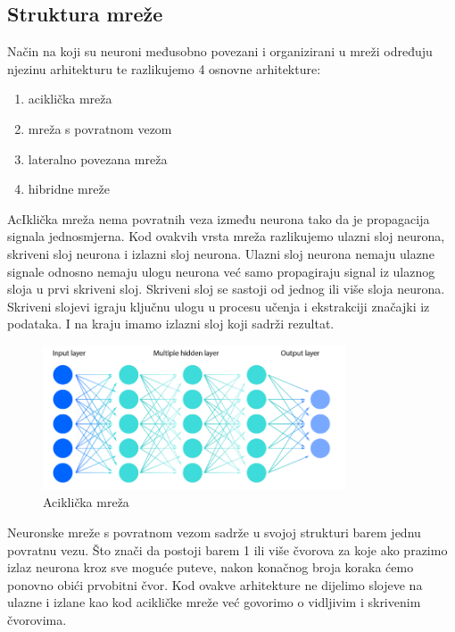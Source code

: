 \subsection{Struktura mreže}\label{subsec:struktura-mreze}
Način na koji su neuroni međusobno povezani i organizirani u mreži određuju njezinu arhitekturu te razlikujemo 4 osnovne arhitekture:

\begin{enumerate}
    \item aciklička mreža
    \item mreža s povratnom vezom
    \item lateralno povezana mreža
    \item hibridne mreže
\end{enumerate}

AcIklička mreža nema povratnih veza između neurona tako da je propagacija signala jednosmjerna.
Kod ovakvih vrsta mreža razlikujemo ulazni sloj neurona, skriveni sloj neurona i izlazni sloj neurona.
Ulazni sloj neurona nemaju ulazne signale odnosno nemaju ulogu neurona već samo propagiraju signal iz ulaznog sloja u prvi skriveni sloj.
Skriveni sloj se sastoji od jednog ili više sloja neurona. Skriveni slojevi igraju ključnu ulogu u procesu učenja i ekstrakciji značajki iz podataka.
I na kraju imamo izlazni sloj koji sadrži rezultat.
\FloatBarrier
\begin{figure}[h]
    \centering
    \includegraphics[width=0.8\textwidth]{images/nn-arch}
    \caption{Aciklička mreža}
    \label{fig:slika4}
\end{figure}
\FloatBarrier

Neuronske mreže s povratnom vezom sadrže u svojoj strukturi barem jednu povratnu vezu.
Što znači da postoji barem 1 ili više čvorova za koje ako prazimo izlaz neurona kroz sve moguće puteve, nakon konačnog broja koraka ćemo ponovno obići prvobitni čvor.
Kod ovakve arhitekture ne dijelimo slojeve na ulazne i izlane kao kod acikličke mreže već govorimo o vidljivim i skrivenim čvorovima.

